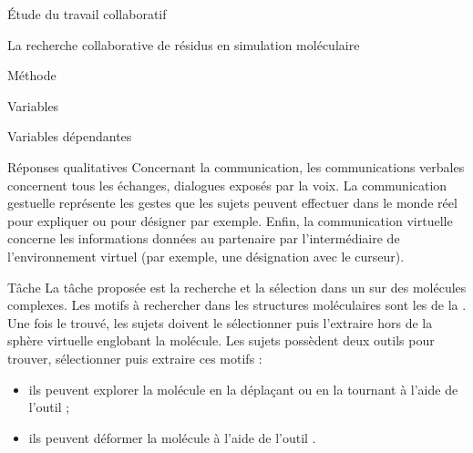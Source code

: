\documentclass[myfrancais]{mythesis}
\begin{document}
\begin{mypart}{Étude du travail collaboratif}
\begin{mychapter}{La recherche collaborative de résidus en simulation moléculaire}
\begin{mysection}{Méthode}
\begin{mysubsection}{Variables}
\begin{mysubsubsection}{Variables dépendantes}
\begin{myparagraph}{ Réponses qualitatives}
							Concernant la communication, les communications verbales concernent tous les échanges, dialogues exposés par la voix.
							La communication gestuelle représente les gestes que les sujets peuvent effectuer dans le monde réel pour expliquer ou pour désigner par exemple.
							Enfin, la communication virtuelle concerne les informations données au partenaire par l'intermédiaire de l'environnement virtuel (par exemple, une désignation avec le curseur).
						\end{myparagraph}
					\end{mysubsubsection}
				\end{mysubsection}
				\begin{mysubsection}[sse-exp1-Tache]{Tâche}
					La tâche proposée est la recherche et la sélection dans un  sur des molécules complexes.
					Les motifs à rechercher dans les structures moléculaires sont les  de la .
					Une fois le  trouvé, les sujets doivent le sélectionner puis l'extraire hors de la sphère virtuelle englobant la molécule.
					Les sujets possèdent deux outils pour trouver, sélectionner puis extraire ces motifs :
					\begin{itemize}
						\item ils peuvent explorer la molécule en la déplaçant ou en la tournant à l'aide de l'outil ;
						\item ils peuvent déformer la molécule à l'aide de l'outil .
					\end{itemize}


\end{mysubsection}
\end{mysection}
\end{mychapter}
\end{mypart}
\end{document}

